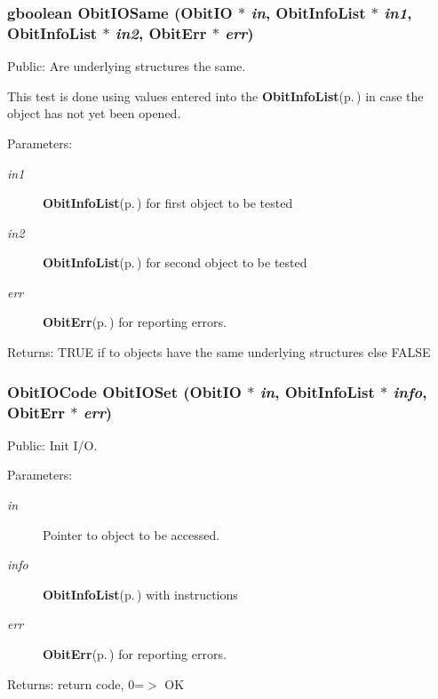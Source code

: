 \subsubsection{\setlength{\rightskip}{0pt plus 5cm}gboolean Obit\-IOSame ({\bf Obit\-IO} $\ast$ {\em in}, {\bf Obit\-Info\-List} $\ast$ {\em in1}, {\bf Obit\-Info\-List} $\ast$ {\em in2}, {\bf Obit\-Err} $\ast$ {\em err})}\label{ObitIO_8c_a8}


Public: Are underlying structures the same. 

This test is done using values entered into the {\bf Obit\-Info\-List}{\rm (p.\,\pageref{structObitInfoList})} in case the object has not yet been opened. \begin{Desc}
\item[Parameters:]
\begin{description}
\item[{\em in1}]{\bf Obit\-Info\-List}{\rm (p.\,\pageref{structObitInfoList})} for first object to be tested \item[{\em in2}]{\bf Obit\-Info\-List}{\rm (p.\,\pageref{structObitInfoList})} for second object to be tested \item[{\em err}]{\bf Obit\-Err}{\rm (p.\,\pageref{structObitErr})} for reporting errors. \end{description}
\end{Desc}
\begin{Desc}
\item[Returns:]TRUE if to objects have the same underlying structures else FALSE \end{Desc}
\subsubsection{\setlength{\rightskip}{0pt plus 5cm}Obit\-IOCode Obit\-IOSet ({\bf Obit\-IO} $\ast$ {\em in}, {\bf Obit\-Info\-List} $\ast$ {\em info}, {\bf Obit\-Err} $\ast$ {\em err})}\label{ObitIO_8c_a14}


Public: Init I/O. 

\begin{Desc}
\item[Parameters:]
\begin{description}
\item[{\em in}]Pointer to object to be accessed. \item[{\em info}]{\bf Obit\-Info\-List}{\rm (p.\,\pageref{structObitInfoList})} with instructions \item[{\em err}]{\bf Obit\-Err}{\rm (p.\,\pageref{structObitErr})} for reporting errors. \end{description}
\end{Desc}
\begin{Desc}
\item[Returns:]return code, 0=$>$ OK \end{Desc}
